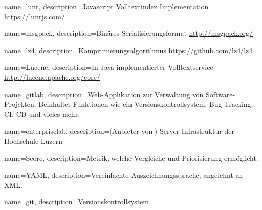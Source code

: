{
    name=lunr,
    description={Javascript Volltextindex Implementation \url{https://lunrjs.com/}}
}

{
    name=msgpack,
    description={Binäres Serialisierungsformat \url{http://msgpack.org/}}
}

{
    name=lz4,
    description={Komprimierungsalgorithmus \url{https://github.com/lz4/lz4}}
}

{
    name=Lucene,
    description={In Java implementierter Volltextservice \url{http://lucene.apache.org/core/}}
}

{
    name=gitlab,
    description={Web-Applikation zur Verwaltung von Software-Projekten. Be\-inhaltet Funktionen wie ein Versionskontrollsystem, Bug-Track\-ing, CI, CD und vieles mehr.}
}

{
    name=enterpriselab,
    description={(Anbieter von ) Server-Infrastruktur der Hochschule Luzern}
}

{
    name=Score,
    description={Metrik, welche Vergleiche und Priorisierung ermöglicht.}
}

{
    name=YAML,
    description={Vereinfachte Auszeichnungssprache, angelehnt an XML.}
}

{
    name=git,
    description={Versionskontrollsystem}
}



\renewcommand{\glstextformat}[1]{\textbf{\itshape #1}}




